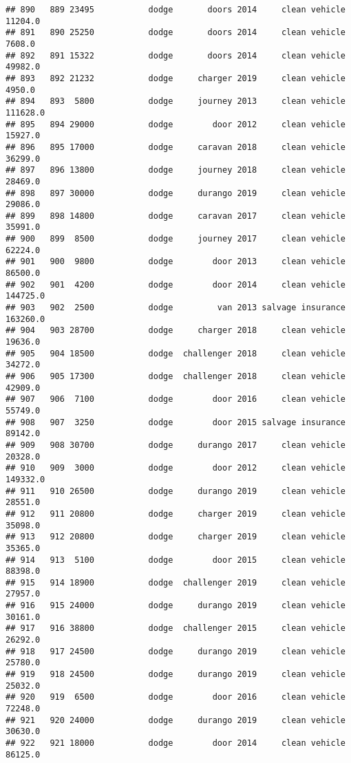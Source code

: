 \documentclass[
]{article}
\begin{document}
\begin{verbatim}
## 890   889 23495           dodge       doors 2014     clean vehicle   11204.0
## 891   890 25250           dodge       doors 2014     clean vehicle    7608.0
## 892   891 15322           dodge       doors 2014     clean vehicle   49982.0
## 893   892 21232           dodge     charger 2019     clean vehicle    4950.0
## 894   893  5800           dodge     journey 2013     clean vehicle  111628.0
## 895   894 29000           dodge        door 2012     clean vehicle   15927.0
## 896   895 17000           dodge     caravan 2018     clean vehicle   36299.0
## 897   896 13800           dodge     journey 2018     clean vehicle   28469.0
## 898   897 30000           dodge     durango 2019     clean vehicle   29086.0
## 899   898 14800           dodge     caravan 2017     clean vehicle   35991.0
## 900   899  8500           dodge     journey 2017     clean vehicle   62224.0
## 901   900  9800           dodge        door 2013     clean vehicle   86500.0
## 902   901  4200           dodge        door 2014     clean vehicle  144725.0
## 903   902  2500           dodge         van 2013 salvage insurance  163260.0
## 904   903 28700           dodge     charger 2018     clean vehicle   19636.0
## 905   904 18500           dodge  challenger 2018     clean vehicle   34272.0
## 906   905 17300           dodge  challenger 2018     clean vehicle   42909.0
## 907   906  7100           dodge        door 2016     clean vehicle   55749.0
## 908   907  3250           dodge        door 2015 salvage insurance   89142.0
## 909   908 30700           dodge     durango 2017     clean vehicle   20328.0
## 910   909  3000           dodge        door 2012     clean vehicle  149332.0
## 911   910 26500           dodge     durango 2019     clean vehicle   28551.0
## 912   911 20800           dodge     charger 2019     clean vehicle   35098.0
## 913   912 20800           dodge     charger 2019     clean vehicle   35365.0
## 914   913  5100           dodge        door 2015     clean vehicle   88398.0
## 915   914 18900           dodge  challenger 2019     clean vehicle   27957.0
## 916   915 24000           dodge     durango 2019     clean vehicle   30161.0
## 917   916 38800           dodge  challenger 2015     clean vehicle   26292.0
## 918   917 24500           dodge     durango 2019     clean vehicle   25780.0
## 919   918 24500           dodge     durango 2019     clean vehicle   25032.0
## 920   919  6500           dodge        door 2016     clean vehicle   72248.0
## 921   920 24000           dodge     durango 2019     clean vehicle   30630.0
## 922   921 18000           dodge        door 2014     clean vehicle   86125.0

\end{verbatim}
\end{document}
